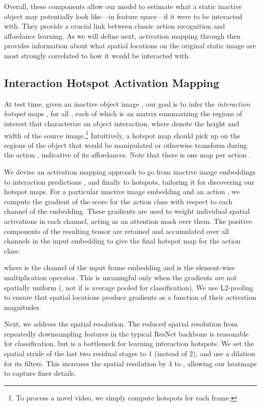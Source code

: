 \documentclass[10pt,twocolumn,letterpaper]{article}
\begin{document}
Overall, these components allow our model to estimate what a static inactive object may potentially look like---in feature space---if it were to be interacted with. They provide a crucial link between classic action recognition and affordance learning.  As we will define next,  activation mapping through  then provides information about what spatial locations on the original static image are most strongly correlated to how it would be interacted with.


\subsection{Interaction Hotspot Activation Mapping}\label{sec:hotspot_modifications}


At test time, given an inactive object image , 
our goal is to infer the \emph{interaction hotspot} maps , for all , each of which is an  matrix summarizing the regions of interest that characterize an object interaction, where  denote the height and width of the source image.\footnote{To process a novel video, we simply compute hotspots for each frame.} 
Intuitively, a hotspot map should pick up on the regions of the object that would be manipulated or otherwise transform during the action , indicative of its affordances. Note that there is one map per action .  


We devise an activation mapping approach to go from inactive image embeddings  to interaction predictions , and finally to hotspots, tailoring it for discovering our hotspot maps. 
For a particular inactive image embedding  and an action , we compute the gradient of the score for the action class with respect to each channel of the embedding. These gradients are used to weight individual spatial activations in each channel, acting as an attention mask over them. The positive components of the resulting tensor are retained and accumulated over all channels in the input embedding to give the final hotspot map  for the action class: 

where  is the  channel of the input frame embedding and  is the element-wise multiplication operator. 
This is meaningful only when the gradients are not spatially uniform (\eg, not if  is average pooled for classification). We use L2-pooling to ensure that spatial locations produce gradients as a function of their activation magnitudes.

Next, we address the spatial resolution. The reduced spatial resolution from repeatedly downsampling features in the typical ResNet backbone is reasonable for classification, but is a bottleneck for learning interaction hotspots. We set the spatial stride of the last two residual stages to 1 (instead of 2), and use a dilation for its filters. This increases the spatial resolution by 4 to , allowing our heatmaps to capture finer details. 
\end{document}
